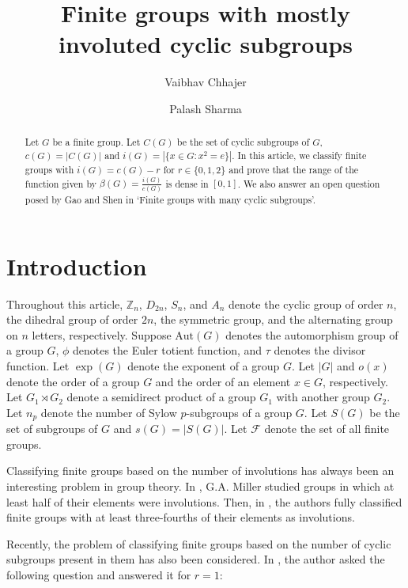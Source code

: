 \documentclass[a4paper,11pt]{amsart}
\title[Finite groups with mostly involuted cyclic subgroups]{Finite groups with mostly involuted cyclic subgroups}
\author{Vaibhav Chhajer}
\author{Palash Sharma}
\numberwithin{equation}{section}
\numberwithin{equation}{subsection}
\begin{document}
\date{}
\begin{abstract} 
Let $G$ be a finite group. Let $C(G)$ be the set of cyclic subgroups of $G$, $c(G)=|C(G)|$ and $i(G)=\left|\{x\in G : x^{2}=e\}\right|$. In this article, we classify finite groups with $i(G)=c(G)-r$ for $r\in \{0,1,2\}$ and prove that the range of the function given by $\beta(G)=\frac{i(G)}{c(G)}$ is dense in $[0,1]$. We also answer an open question posed by Gao and Shen in `Finite groups with many cyclic subgroups'.

\end{abstract}
\maketitle


\section{Introduction} 


Throughout this article, $\mathbb{Z}_{n}$, $D_{2n}$, $S_n$, and $A_n$ denote the cyclic group of order $n$, the dihedral group of order $2n$, the symmetric group, and the alternating group on $n$ letters, respectively. Suppose $\text{Aut}(G)$ denotes the automorphism group of a group $G$, $\phi$ denotes the Euler totient function, and $\tau$ denotes the divisor function. Let $\exp(G)$ denote the exponent of a group $G$. Let $|G|$ and $o(x)$ denote the order of a group $G$ and the order of an element $x \in G$, respectively. Let $G_{1}\rtimes G_{2}$ denote a semidirect product of a group $G_{1}$ with another group $G_{2}$. Let $n_{p}$ denote the number of Sylow $p$-subgroups of a group $G$. Let $S(G)$ be the set of subgroups of $G$ and $s(G)=|S(G)|$. Let $\mathcal{F}$ denote the set of all finite groups.

Classifying finite groups based on the number of involutions has always been an interesting problem in group theory. In \cite{M}, G.A. Miller studied groups in which at least half of their elements were involutions. Then, in \cite{EN}, the authors fully classified finite groups with at least three-fourths of their elements as involutions. 

Recently, the problem of classifying finite groups based on the number of cyclic subgroups present in them has also been considered. In \cite{MT}, the author asked the following question and answered it for $r=1$:
\end{document}
